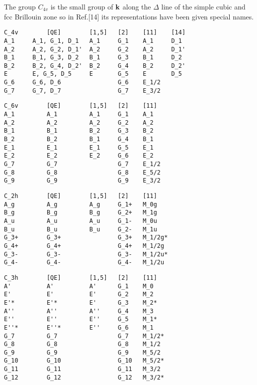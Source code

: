 \documentclass[12pt,a4paper]{article}
\begin{document}
The group $C_{4v}$ is the small group of ${\bf k}$ along the $\Delta$ line of
the simple cubic and fcc Brillouin zone so in Ref.[14] its representations have 
been given special names.
\begin{verbatim}
C_4v        [QE]        [1,5]   [2]    [11]    [14]
A_1     A_1, G_1, D_1   A_1     G_1    A_1     D_1
A_2     A_2, G_2, D_1'  A_2     G_2    A_2     D_1'
B_1     B_1, G_3, D_2   B_1     G_3    B_1     D_2
B_2     B_2, G_4, D_2'  B_2     G_4    B_2     D_2'
E       E, G_5, D_5     E       G_5    E       D_5
G_6     G_6, D_6                G_6    E_1/2
G_7     G_7, D_7                G_7    E_3/2
\end{verbatim}

\begin{verbatim}
C_6v        [QE]        [1,5]   [2]    [11]
A_1         A_1         A_1     G_1    A_1
A_2         A_2         A_2     G_2    A_2
B_1         B_1         B_2     G_3    B_2
B_2         B_2         B_1     G_4    B_1
E_1         E_1         E_1     G_5    E_1
E_2         E_2         E_2     G_6    E_2
G_7         G_7                 G_7    E_1/2
G_8         G_8                 G_8    E_5/2
G_9         G_9                 G_9    E_3/2
\end{verbatim}

\begin{verbatim}
C_2h        [QE]        [1,5]   [2]    [11] 
A_g         A_g         A_g     G_1+   M_0g
B_g         B_g         B_g     G_2+   M_1g
A_u         A_u         A_u     G_1-   M_0u
B_u         B_u         B_u     G_2-   M_1u
G_3+        G_3+                G_3+   M_1/2g*
G_4+        G_4+                G_4+   M_1/2g
G_3-        G_3-                G_3-   M_1/2u*
G_4-        G_4-                G_4-   M_1/2u
\end{verbatim}

\begin{verbatim}
C_3h        [QE]        [1,5]   [2]    [11] 
A'          A'          A'      G_1    M_0
E'          E'          E'      G_2    M_2
E'*         E'*         E'      G_3    M_2*
A''         A''         A''     G_4    M_3
E''         E''         E''     G_5    M_1*
E''*        E''*        E''     G_6    M_1
G_7         G_7                 G_7    M_1/2*
G_8         G_8                 G_8    M_1/2
G_9         G_9                 G_9    M_5/2
G_10        G_10                G_10   M_5/2*
G_11        G_11                G_11   M_3/2
G_12        G_12                G_12   M_3/2*
\end{verbatim}
\end{document}
